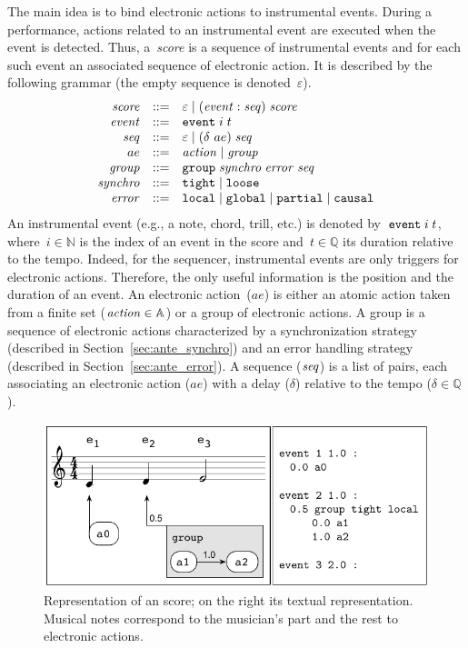 \documentclass[preprint]{sigplanconf}
\begin{document}
The main idea is to bind electronic actions to instrumental
events. During a performance, actions related to an instrumental event
are executed when the event is detected. Thus, a~\emph{score} is a
sequence of instrumental events and for each such event an associated
sequence of electronic action.  It is described by the following
grammar (the empty sequence is denoted~$\varepsilon$).
%
\[
\begin{array}{rcl}
  {{\mbox{\emph{score}}}} &::=& \varepsilon \;|\;
                  ({{\mbox{\emph{event}}}} :  {{\mbox{\emph{seq}}}}) \; {{\mbox{\emph{score}}}}  \\
  {{\mbox{\emph{event}}}} &::=& {\tt{event}} \; i \; t\\
  {{\mbox{\emph{seq}}}} &::=& \varepsilon \;|\; (\delta \ ae) \; {{\mbox{\emph{seq}}}} \\
  ae &::=& {{\mbox{\emph{action}}}} \;|\; {{\mbox{\emph{group}}}} \\
  {{\mbox{\emph{group}}}} &::=& {\tt{group}} \; {{\mbox{\emph{synchro}}}} \; {{\mbox{\emph{error}}}} \; {{\mbox{\emph{seq}}}} \\
  {{\mbox{\emph{synchro}}}} &::=&  {\tt{tight}} \;|\; {\tt{loose}} \\
  {{\mbox{\emph{error}}}} &::=& {\tt{local}} \;|\; {\tt{global}} \;|\; {\tt{partial}} \;|\; {\tt{causal}}\\
\end{array}
\]
%
An instrumental event (e.g., a note, chord, trill, etc.) is denoted
by~${\tt{event}} \; i \; t$, where~$i \in \mathbb{N}$ is the index of an
event in the score and~$t \in \mathbb{Q}$ its duration relative to the
tempo.  Indeed, for the sequencer, instrumental events are only
triggers for electronic actions. Therefore, the only useful
information is the position and the duration of an event. An
electronic action~($ae$) is either an atomic action taken from a
finite set (${{\mbox{\emph{action}}}} \in \mathbb{A}$) or a group of electronic
actions.  A group is a sequence of electronic actions characterized by
a synchronization strategy (described in
Section~\ref{sec:ante_synchro}) and an error handling strategy
(described in Section~\ref{sec:ante_error}).  A sequence ($\mathit{seq}$) is a
list of pairs, each associating an electronic action ($ae$) with a
delay ($\delta$) relative to the tempo ($\delta \in \mathbb{Q}$).

\begin{figure}
\centering
\includegraphics[scale = 0.71]{asco_score.pdf}
\caption{%
  Representation of an \Antescofo{} score; on the right its textual
  representation.  Musical notes correspond to the musician's part and
  the rest to electronic actions.}
\label{fig:asco_score}
\end{figure}
\end{document}
